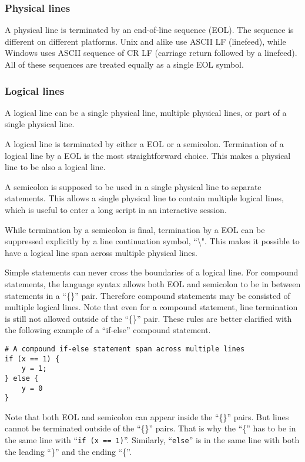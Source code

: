 \documentclass[10pt,a4paper]{article}
\begin{document}
\subsubsection{Physical lines}
A physical line is terminated by an end-of-line sequence (EOL). The
sequence is different on different platforms. Unix and alike use ASCII LF
(linefeed), while Windows uses ASCII sequence of CR LF (carriage return followed
by a linefeed). All of these sequences are treated equally as a single 
EOL symbol.

\subsubsection{Logical lines}
A logical line can be a single physical line, multiple physical lines, or
part of a single physical line.

A logical line is terminated by either a EOL or a semicolon.
Termination of a logical line by a EOL is the most 
straightforward choice. This makes a physical 
line to be also a logical line.

A semicolon is supposed to be used in a single physical line to separate 
statements. This allows a single physical line to contain multiple logical
lines, which is useful to enter a long script in an interactive session.

While termination by a semicolon is final, termination by a EOL can be 
suppressed explicitly by a line continuation symbol, ``\textbackslash".
This makes it possible to have a logical line span across multiple 
physical lines. 

Simple statements can never cross the boundaries of a logical line.
For compound statements, the language syntax allows both EOL and semicolon
to be in between statements in a ``\{\}'' pair. Therefore compound statements
may be consisted of multiple logical lines. Note that even for a compound 
statement, line termination is still not allowed outside of the 
``\{\}'' pair. 
These rules are better clarified with the following example of a ``if-else''
compound statement. 

\begin{lstlisting}
# A compound if-else statement span across multiple lines
if (x == 1) {
    y = 1;
} else {
    y = 0
}
\end{lstlisting}

Note that both EOL and semicolon can appear inside the ``\{\}'' pairs. 
But lines cannot be terminated outside of the ``\{\}'' pairs. That is
why the ``\{'' has to be in the same line with ``\lstinline$if (x == 1)$''.
Similarly, ``\lstinline$else$'' is in the same line with both the leading
``\}'' and the ending ``\{''.
\end{document}
